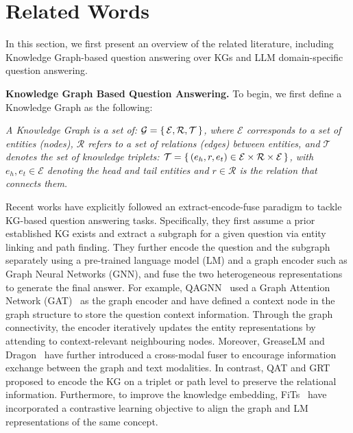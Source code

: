 \section*{Related Words}

In this section, we first present an overview of the related literature, including Knowledge Graph-based question answering over KGs and LLM domain-specific question answering.

\textbf{Knowledge Graph Based Question Answering. }
To begin, we first define a Knowledge Graph as the following:
\begin{definition}
    \emph{A Knowledge Graph is a set of: $\mathcal G = \set{\mathcal E, \mathcal R, \mathcal T}$, where $\mathcal E$ corresponds to a set of entities (nodes),
    $\mathcal R$ refers to a set of relations (edges) between entities,
    and $\mathcal T$ denotes the set of knowledge triplets: $\mathcal T = \set{(e_h,r,e_t)\in \mathcal E\times \mathcal R\times \mathcal E}$, with $e_h, e_t \in \mathcal E$ denoting the head and tail entities
    and $r\in\mathcal R$ is the relation that connects them.}
\end{definition}

Recent works have explicitly followed an extract-encode-fuse paradigm to tackle KG-based question answering tasks.
Specifically, they first assume a prior established KG exists and extract a subgraph for a given question via entity linking and path finding. 
They further encode the question and the subgraph separately using a pre-trained language model (LM) and a graph encoder such as Graph Neural Networks (GNN), and fuse the two heterogeneous representations to generate the final answer.
For example, QAGNN~\parencite{qagnn} used a Graph Attention Network (GAT)~\parencite{gat} as the graph encoder and have defined a context node in the graph structure to store the question context information. 
Through the graph connectivity, the encoder iteratively updates the entity representations by attending to context-relevant neighbouring nodes.
Moreover, GreaseLM and Dragon~\parencite{greaselm, dragon} have further introduced a cross-modal fuser to encourage information exchange between the graph and text modalities. 
In contrast, QAT and GRT~\parencite{qat, grt} proposed to encode the KG on a triplet or path level to preserve the relational information.
Furthermore, to improve the knowledge embedding, FiTs~\parencite{fits} have incorporated a contrastive learning objective to align the graph and LM representations of the same concept. 

